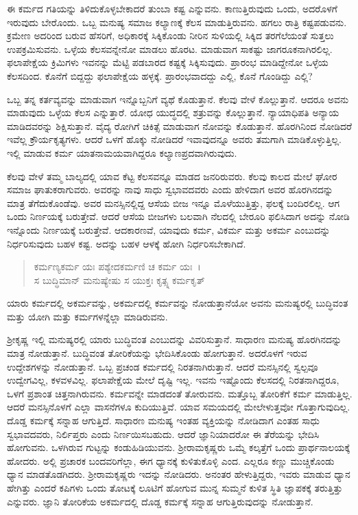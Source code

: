 ಈ ಕರ್ಮದ ಗತಿಯನ್ನು ತಿಳಿದುಕೊಳ್ಳಬೇಕಾದರೆ ತುಂಬಾ ಕಷ್ಟ ಎನ್ನುವನು. ಕಾಣುತ್ತಿರುವುದು ಒಂದು, ಅದರೊಳಗೆ ಇರುವುದು ಬೇರೊಂದು. ಒಬ್ಬ ಮನುಷ್ಯ ಸಮಾಜ ಕಲ್ಯಾಣಕ್ಕೆ ಕೆಲಸ ಮಾಡುತ್ತಿರುವನು. ಹಗಲು ರಾತ್ರಿ ಕಷ್ಟಪಡುವನು. ಕ್ರಮೇಣ ಅದರಿಂದ ಬರುವ ಹೆಸರಿಗೆ, ಅಧಿಕಾರಕ್ಕೆ ಸಿಕ್ಕಿಕೊಂಡು ನೀರಿನ ಸುಳಿಯಲ್ಲಿ ಸಿಕ್ಕಿದ ತರಗೆಲೆಯಂತೆ ಸುತ್ತಲು ಉಪಕ್ರಮಿಸುವನು. ಒಳ್ಳೆಯ ಕೆಲಸವನ್ನೇನೋ ಮಾಡಲು ಹೊರಟ. ಮಾಡುವಾಗ ಸಾಕಷ್ಟು ಜಾಗರೂಕನಾಗಿರಲಿಲ್ಲ. ಫಲಾಪೇಕ್ಷೆಯ ಕ್ರಿಮಿಗಳು ಇವನನ್ನು ಮೆಟ್ಟಿ ಪಡಬಾರದ ಕಷ್ಟಕ್ಕೆ ಸಿಕ್ಕಿಸುವುದು. ಪ್ರಾರಂಭ ಮಾಡಿದ್ದೇನೋ ಒಳ್ಳೆಯ ಕೆಲಸದಿಂದ. ಕೊನೆಗೆ ಬಿದ್ದದ್ದು ಫಲಾಪೇಕ್ಷೆಯ ಹಳ್ಳಕ್ಕೆ. ಪ್ರಾರಂಭವಾದದ್ದು ಎಲ್ಲಿ, ಕೊನೆ ಗೊಂಡಿದ್ದು ಎಲ್ಲಿ?

ಒಬ್ಬ ತನ್ನ ಕರ್ತವ್ಯವನ್ನು ಮಾಡುವಾಗ ಇನ್ನೊಬ್ಬನಿಗೆ ವ್ಯಥೆ ಕೊಡುತ್ತಾನೆ. ಕೆಲವು ವೇಳೆ ಕೊಲ್ಲುತ್ತಾನೆ. ಆದರೂ ಅವನು ಮಾಡುವುದು ಒಳ್ಳೆಯ ಕೆಲಸ ಎನ್ನುತ್ತಾರೆ. ಯೋಧ ಯುದ್ಧದಲ್ಲಿ ಶತ್ರುವನ್ನು ಕೊಲ್ಲುತ್ತಾನೆ. ನ್ಯಾಯಾಧಿಪತಿ ಅನ್ಯಾಯ ಮಾಡಿದವರನ್ನು ಶಿಕ್ಷಿಸುತ್ತಾನೆ. ವೈದ್ಯ ರೋಗಿಗೆ ಚಿಕಿತ್ಸೆ ಮಾಡುವಾಗ ನೋವನ್ನು ಕೊಡುತ್ತಾನೆ. ಹೊರಗಿನಿಂದ ನೋಡಿದರೆ ಇವೆಲ್ಲ ಕ್ರೌರ್ಯಕೃತ್ಯಗಳು. ಆದರೆ ಒಳಗೆ ಹೊಕ್ಕು ನೋಡಿದರೆ ಇವಾವುದನ್ನೂ ಅವರು ತಮಗಾಗಿ ಮಾಡಿಕೊಳ್ಳುತ್ತಿಲ್ಲ. ಇಲ್ಲಿ ಮಾಡುವ ಕರ್ಮ ಯಾತನಾಮಯವಾಗಿದ್ದರೂ ಕಲ್ಯಾಣಪ್ರದವಾಗಿರುವುದು.

ಕೆಲವು ವೇಳೆ ತಮ್ಮ ಬಾಲ್ಯದಲ್ಲಿ ಯಾವ ಕೆಟ್ಟ ಕೆಲಸವನ್ನೂ ಮಾಡದ ಜನರಿರುವರು. ಕೆಲವು ಕಾಲದ ಮೇಲೆ ಘೋರ ಸಮಾಜ ಘಾತುಕರಾಗುವರು. ಅವರನ್ನು ನಾವು ಸಾಧು ಸ್ವಭಾವದವರು ಎಂದು ಹೇಳಿದಾಗ ಅವರ ಹೊರಗಿನದನ್ನು ಮಾತ್ರ ತೆಗೆದುಕೊಂಡೆವು. ಅವರ ಮನಸ್ಸಿನಲ್ಲಿದ್ದ ಆಸೆಯ ಬೀಜ ಇನ್ನೂ ಮೊಳೆಯುತ್ತಿತ್ತು, ಫಲಕ್ಕೆ ಬಂದಿರಲಿಲ್ಲ. ಆಗ ಒಂದು ನಿರ್ಣಯಕ್ಕೆ ಬರುತ್ತೇವೆ. ಆದರೆ ಆಸೆಯ ಬೀಜಗಳು ಬಲವಾಗಿ ನೆಲದಲ್ಲಿ ಬೇರೂರಿ ಫಲಿಸಿದಾಗ ಅದನ್ನು ನೋಡಿ ಇನ್ನೊಂದು ನಿರ್ಣಯಕ್ಕೆ ಬರುತ್ತೇವೆ. ಆದಕಾರಣವೆ, ಯಾವುದು ಕರ್ಮ, ವಿಕರ್ಮ ಮತ್ತು ಅಕರ್ಮ ಎಂಬುದನ್ನು ನಿರ್ಧರಿಸುವುದು ಬಹಳ ಕಷ್ಟ. ಅದನ್ನು ಬಹಳ ಆಳಕ್ಕೆ ಹೋಗಿ ನಿರ್ಧರಿಸಬೇಕಾಗಿದೆ.

\begin{verse}
ಕರ್ಮಣ್ಯಕರ್ಮ ಯಃ ಪಶ್ಯೇದಕರ್ಮಣಿ ಚ ಕರ್ಮ ಯಃ~।\\ಸ ಬುದ್ಧಿಮಾನ್ ಮನುಷ್ಯೇಷು ಸ ಯುಕ್ತಃ ಕೃತ್ಸ್ನ ಕರ್ಮಕೃತ್ 
\end{verse}

{\small ಯಾರು ಕರ್ಮದಲ್ಲಿ ಅಕರ್ಮವನ್ನು, ಅಕರ್ಮದಲ್ಲಿ ಕರ್ಮವನ್ನು ನೋಡುತ್ತಾನೆಯೋ ಅವನು ಮನುಷ್ಯರಲ್ಲಿ ಬುದ್ಧಿವಂತ ಮತ್ತು ಯೋಗಿ ಮತ್ತು ಕರ್ಮಗಳನ್ನೆಲ್ಲಾ ಮಾಡಿರುವನು.}

ಶ‍್ರೀಕೃಷ್ಣ ಇಲ್ಲಿ ಮನುಷ್ಯರಲ್ಲಿ ಯಾರು ಬುದ್ಧಿವಂತ ಎಂಬುದನ್ನು ವಿವರಿಸುತ್ತಾನೆ. ಸಾಧಾರಣ ಮನುಷ್ಯ ಹೊರಗಿನದನ್ನು ಮಾತ್ರ ನೋಡುತ್ತಾನೆ. ಬುದ್ಧಿವಂತ ತೋರಿಕೆಯನ್ನು ಭೇದಿಸಿಕೊಂಡು ಹೋಗುತ್ತಾನೆ. ಅದರೊಳಗೆ ಇರುವ ಉದ್ದೇಶಗಳನ್ನು ನೋಡುತ್ತಾನೆ. ಒಬ್ಬ ಪ್ರಚಂಡ ಕರ್ಮದಲ್ಲಿ ನಿರತನಾಗಿರುತ್ತಾನೆ. ಆದರೆ ಮನಸ್ಸಿನಲ್ಲಿ ಸ್ವಲ್ಪವೂ ಉದ್ವೇಗವಿಲ್ಲ, ಕಳವಳವಿಲ್ಲ. ಫಲಾಪೇಕ್ಷೆಯ ಮೇಲೆ ದೃಷ್ಟಿ ಇಲ್ಲ. ಇವನು ಇಷ್ಟೊಂದು ಕೆಲಸದಲ್ಲಿ ನಿರತನಾಗಿದ್ದರೂ, ಒಳಗೆ ಪ್ರಶಾಂತ ಚಿತ್ತನಾಗಿರುವನು. ಕರ್ಮವನ್ನೇ ಮಾಡದಂತೆ ತೋರುವನು. ಮತ್ತೊಬ್ಬ ತೋರಿಕೆಗೆ ಕರ್ಮ ಮಾಡುತ್ತಿಲ್ಲ. ಆದರೆ ಮನಸ್ಸಿನೊಳಗೆ ಎಲ್ಲಾ ವಾಸನೆಗಳೂ ಕುದಿಯುತ್ತಿವೆ. ಯಾವ ಸಮಯದಲ್ಲಿ ಮೇಲೇಳುತ್ತವೋ ಗೊತ್ತಾಗುವುದಿಲ್ಲ. ದೊಡ್ಡ ಕರ್ಮಕ್ಕೆ ಸನ್ನಾಹ ಆಗುತ್ತಿದೆ. ಸಾಧಾರಣ ಮನುಷ್ಯ ಇಂತಹ ವ್ಯಕ್ತಿಯನ್ನು ನೋಡಿದಾಗ ಎಂತಹ ಸಾಧು ಸ್ವಭಾವದವರು, ನಿರ್ಲಿಪ್ತರು ಎಂದು ನಿರ್ಣಯಿಸಬಹುದು. ಆದರೆ ಜ್ಞಾನಿಯಾದರೋ ಈ ತೆರೆಯನ್ನು ಭೇದಿಸಿ ಹೋಗುವನು. ಒಳಗಿರುವ ಗುಟ್ಟನ್ನು ಕಂಡುಹಿಡಿಯುವನು. ಶ‍್ರೀರಾಮಕೃಷ್ಣರು ಒಮ್ಮೆ ಕಲ್ಕತ್ತೆಗೆ ಒಂದು ಪ್ರಾರ್ಥನಾಲಯಕ್ಕೆ ಹೋದರು. ಅಲ್ಲಿ ಪ್ರಚಾರಕ ಬಂದವರಿಗೆಲ್ಲಾ, ಈಗ ಧ್ಯಾನಕ್ಕೆ ಕುಳಿತುಕೊಳ್ಳಿ ಎಂದ. ಎಲ್ಲರೂ ಕಣ್ಣು ಮುಚ್ಚಿಕೊಂಡು ಧ್ಯಾನ ಮಾಡತೊಡಗಿದರು. ಶ‍್ರೀರಾಮಕೃಷ್ಣರು ಇದನ್ನು ನೋಡಿದರು. ಅನಂತರ ಹೇಳುತ್ತಿದ್ದರು, ಇವರು ಮಾಡುವ ಧ್ಯಾನ ಹೇಗಿತ್ತು ಎಂದರೆ ಕಪಿಗಳು ಒಂದು ತೋಟಕ್ಕೆ ಲೂಟಿಗೆ ಹೋಗುವ ಮುನ್ನ ಸುಮ್ಮನೆ ಕುಳಿತ ಸ್ಥಿತಿ ಜ್ಞಾಪಕಕ್ಕೆ ತರುತ್ತಿತ್ತು ಎನ್ನುವರು. ಜ್ಞಾನಿ ತೋರಿಕೆಯ ಅಕರ್ಮದಲ್ಲಿ ದೊಡ್ಡ ಕರ್ಮಕ್ಕೆ ಸನ್ನಾಹ ಆಗುತ್ತಿರುವುದನ್ನು ನೋಡುತ್ತಾನೆ.

